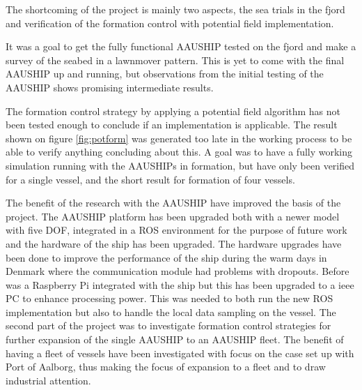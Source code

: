 The shortcoming of the project is mainly two aspects, the sea trials in the fjord and verification of the formation control with potential field implementation.

It was a goal to get the fully functional AAUSHIP tested on the fjord and make a survey of the seabed in a lawnmover pattern. This is yet to come with the final AAUSHIP up and running, but observations from the initial testing of the AAUSHIP shows promising intermediate results.

The formation control strategy by applying a potential field algorithm has not been tested enough to conclude if an implementation is applicable. The result shown on figure \ref{fig:potform} was generated too late in the working process to be able to verify anything concluding about this. A goal was to have a fully working simulation running with the AAUSHIPs in formation, but have only been verified for a single vessel, and the short result for formation of four vessels.

The benefit of the research with the AAUSHIP have improved the basis of the project. The AAUSHIP platform has been upgraded both with a newer model with five \ac{DOF}, integrated in a \ac{ROS} environment for the purpose of future work and the hardware of the ship has been upgraded. The hardware upgrades have been done to improve the performance of the ship during the warm days in Denmark where the communication module had problems with dropouts. Before was a Raspberry Pi integrated with the ship but this has been upgraded to a ieee PC to enhance processing power. This was needed to both run the new \ac{ROS} implementation but also to handle the local data sampling on the vessel. The second part of the project was to investigate formation control strategies for further expansion of the single AAUSHIP to an AAUSHIP fleet. The benefit of having a fleet of vessels have been investigated with focus on the case set up with Port of Aalborg, thus making the focus of expansion to a fleet and to draw industrial attention.
